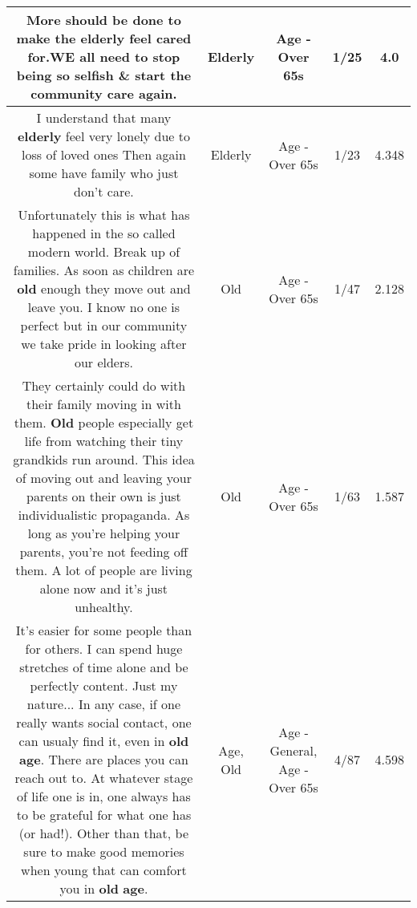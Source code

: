 \documentclass[11pt]{article}
\newlength\mylength
\begin{document}
\begin{center}
\begin{longtable}{|C{.65\mylength}|C{.30\mylength}|C{.12\mylength}|C{.12\mylength}|C{.12\mylength}|}
  \small More should be done to make the \textbf{elderly} feel cared for.WE all need to stop being so selfish \& start the community care again.\normalsize   & Elderly & Age - Over 65s & 1/25 & 4.0 \\  \hline
  \small I understand that many \textbf{elderly} feel very lonely due to loss of loved ones Then again some have family who just don't care.\normalsize   & Elderly & Age - Over 65s & 1/23 & 4.348 \\  \hline
  \small Unfortunately this is what has happened in the so called modern world. Break up of families.  As soon as children are \textbf{old} enough they move out and leave you.  I know no one is perfect but in our community we take pride in looking after our elders.\normalsize   & Old & Age - Over 65s & 1/47 & 2.128 \\  \hline
  \small They certainly could do with their family moving in with them. \textbf{Old} people especially get life from watching their tiny grandkids run around. This idea of moving out and leaving your parents on their own is just individualistic propaganda. As long as you're helping your parents, you're not feeding off them. A lot of people are living alone now and it's just unhealthy.\normalsize   & Old & Age - Over 65s & 1/63 & 1.587 \\  \hline
  \small It's easier for some people than for others. I can spend huge stretches of time alone and be perfectly content. Just my nature... In any case, if one really wants social contact, one can usualy find it, even in \textbf{old} \textbf{age}. There are places you can reach out to. At whatever stage of life one is in,  one always has to be grateful for what one has (or had!). Other than that, be sure to make good memories when young that can comfort you in \textbf{old} \textbf{age}.\normalsize   & Age, Old & Age - General, Age - Over 65s & 4/87 & 4.598 \\  \hline

\end{longtable}
\end{center}
\end{document}
